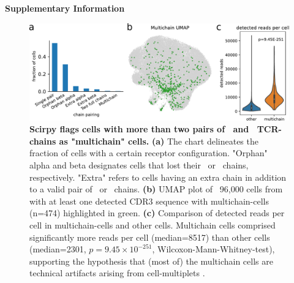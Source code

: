\documentclass{article}
\begin{document}
\begin{center}
    \normalfont\Large\bfseries{Supplementary Information}
\end{center}
\vspace*{60pt}

\begin{figure}[H]
  \centering
  \includegraphics[width=7in]{../figures/multichains.pdf}
  \caption{
    \textbf{Scirpy flags cells with more than two pairs of \textalpha\ and \textbeta\ TCR-chains as "multichain" cells.} 
    \textbf{(a)} The chart delineates the fraction of
    cells with a certain receptor configuration. "Orphan" alpha and beta designates cells that lost their \textbeta\ or \textalpha\ chains, respectively. "Extra" refers to cells having an extra chain in addition to a valid pair of
    \textalpha\ or \textbeta\ chains. 
    \textbf{(b)} UMAP plot of ~96,000 cells from \textcite{Wu2020-vp} with at
    least one detected CDR3 sequence with multichain-cells (n=474) highlighted in green.
    \textbf{(c)} Comparison of detected reads per cell in multichain-cells and other cells.
    Multichain cells comprised significantly more reads per cell (median=8517) than other cells (median=2301, $p=9.45 \times 10^{-251}$, Wilcoxon-Mann-Whitney-test), supporting the hypothesis 
    that (most of) the multichain cells are technical artifacts arising from 
    cell-multiplets \cite{Ilicic2016-ny}. }
\end{figure}
\end{document}

